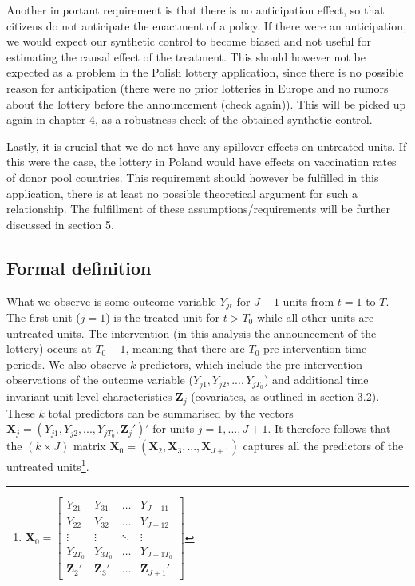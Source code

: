 \documentclass{scrbook}
\begin{document}
Another important requirement is that there is no anticipation effect,
so that citizens do not anticipate the enactment of a policy. If there
were an anticipation, we would expect our synthetic control to become
biased and not useful for estimating the causal effect of the treatment.
This should however not be expected as a problem in the Polish lottery
application, since there is no possible reason for anticipation (there
were no prior lotteries in Europe and no rumors about the lottery before
the announcement (check again)). This will be picked up again in chapter
4, as a robustness check of the obtained synthetic control.

Lastly, it is crucial that we do not have any spillover effects on
untreated units. If this were the case, the lottery in Poland would have
effects on vaccination rates of donor pool countries. This requirement
should however be fulfilled in this application, there is at least no
possible theoretical argument for such a relationship. The fulfillment
of these assumptions/requirements will be further discussed in section
5.

\subsection*{Formal definition}

What we observe is some outcome variable \(Y_{jt}\) for \(J + 1\) units
from \(t=1\) to \(T\). The first unit (\(j = 1\)) is the treated unit
for \(t>T_{0}\) while all other units are untreated units. The
intervention (in this analysis the announcement of the lottery) occurs
at \(T_{0}+1\), meaning that there are \(T_{0}\) pre-intervention time
periods. We also observe \(k\) predictors, which include the
pre-intervention observations of the outcome variable
(\(Y_{j1},Y_{j2},...,Y_{jT_{0}}\)) and additional time invariant unit
level characteristics \(\mathbf{Z}_{j}\) (covariates, as outlined in
section 3.2). These \(k\) total predictors can be summarised by the
vectors
\(\mathbf{X}_{j}=(Y_{j1},Y_{j2},...,Y_{jT_{0}},\mathbf{Z}_{j}')'\) for
units \(j=1,...,J + 1\). It therefore follows that the \((k\times J)\)
matrix
\(\mathbf{X}_{0}=(\mathbf{X}_{2},\mathbf{X}_{3},...,\mathbf{X}_{J + 1})\)
captures all the predictors of the untreated
units\footnote{\(\mathbf{X}_0=
\begin{bmatrix}
Y_{21} & Y_{31} & \dots & Y_{J+11}\\
Y_{22} & Y_{32} & \dots & Y_{J+12}\\
\vdots & \vdots & \ddots & \vdots\\
Y_{2T_{0}} & Y_{3T_{0}} & \dots & Y_{J+1T_{0}}\\
\mathbf{Z}_{2}' & \mathbf{Z}_{3}' & \dots & \mathbf{Z}_{J + 1}'
\end{bmatrix}\)}.
\end{document}
